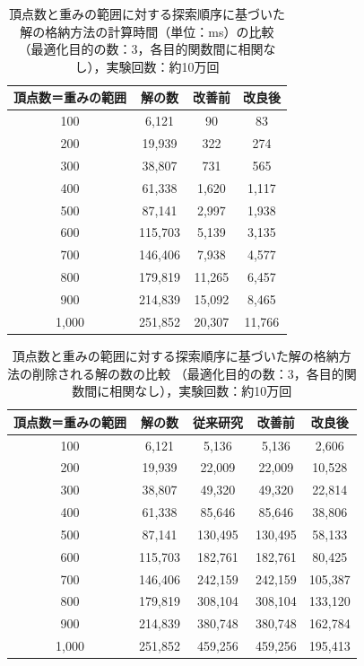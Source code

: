 \documentclass[12pt]{optlab-bachelor}
\begin{document}
\begin{table}[h]
  \centering
  \caption{頂点数と重みの範囲に対する探索順序に基づいた解の格納方法の計算時間（単位：ms）の比較
  （最適化目的の数：3，各目的関数間に相関なし），実験回数：約10万回}
  {\small
  \begin{tabular}{|c|c|c|c|} \hline
    頂点数＝重みの範囲 & 解の数 & 改善前 & 改良後 \\ \hline
    100 & 	6,121 & 	90 & 	83 \\ \hline
    200 & 	19,939 & 	322 & 	274 \\ \hline
    300 & 	38,807  & 731 & 	565 \\ \hline
    400 & 	61,338 & 	1,620 & 	1,117 \\ \hline
    500 & 	87,141 & 	2,997 & 	1,938 \\ \hline
    600 & 	115,703 & 	5,139 & 	3,135 \\ \hline
    700 & 	146,406 & 	7,938 & 	4,577 \\ \hline
    800 & 	179,819 & 	11,265 & 	6,457 \\ \hline
    900 & 	214,839 & 	15,092 & 	8,465 \\ \hline
    1,000 & 	251,852 & 	20,307 & 	11,766 \\ \hline
  \end{tabular}
  }
\end{table}

\begin{table}[h]
  \centering
  \caption{頂点数と重みの範囲に対する探索順序に基づいた解の格納方法の削除される解の数の比較
  （最適化目的の数：3，各目的関数間に相関なし），実験回数：約10万回}
  {\small
  \begin{tabular}{|c|c|c|c|c|} \hline
    頂点数＝重みの範囲 & 解の数 & 従来研究 & 改善前 & 改良後 \\ \hline
    100 & 	6,121 & 	5,136 & 	5,136 & 	2,606 \\ \hline
    200 & 	19,939 & 	22,009 & 	22,009 & 	10,528 \\ \hline
    300 & 	38,807 & 	49,320 & 	49,320 & 	22,814 \\ \hline
    400 & 	61,338 & 	85,646 & 	85,646 & 	38,806 \\ \hline
    500 & 	87,141 & 	130,495 & 	130,495 & 	58,133 \\ \hline
    600 & 	115,703 & 	182,761 & 	182,761 & 	80,425 \\ \hline
    700 & 	146,406 & 	242,159 & 	242,159 & 	105,387 \\ \hline
    800 & 	179,819 & 	308,104 & 	308,104 & 	133,120 \\ \hline
    900 & 	214,839 & 	380,748 & 	380,748 & 	162,784 \\ \hline
    1,000 & 	251,852 & 	459,256 & 	459,256 & 	195,413 \\ \hline
  \end{tabular}
  }
\end{table}
\end{document}
